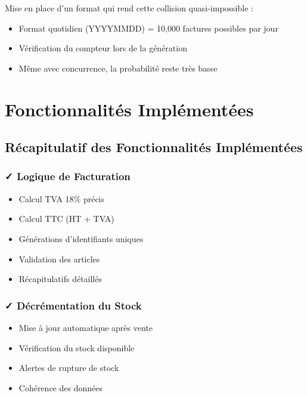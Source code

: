 \documentclass[12pt,a4paper]{report}
\begin{document}
Mise en place d'un format qui rend cette collision quasi-impossible :
\begin{itemize}
    \item Format quotidien (YYYYMMDD) = 10,000 factures possibles par jour
    \item Vérification du compteur lors de la génération
    \item Même avec concurrence, la probabilité reste très basse
\end{itemize}

\pagebreak

\chapter{Fonctionnalités Implémentées}

\section{Récapitulatif des Fonctionnalités Implémentées}

\subsection{✓ Logique de Facturation}

\begin{itemize}
    \item[✓] Calcul TVA 18\% précis
    \item[✓] Calcul TTC (HT + TVA)
    \item[✓] Générations d'identifiants uniques
    \item[✓] Validation des articles
    \item[✓] Récapitulatifs détaillés
\end{itemize}

\subsection{✓ Décrémentation du Stock}

\begin{itemize}
    \item[✓] Mise à jour automatique après vente
    \item[✓] Vérification du stock disponible
    \item[✓] Alertes de rupture de stock
    \item[✓] Cohérence des données
\end{itemize}
\end{document}
